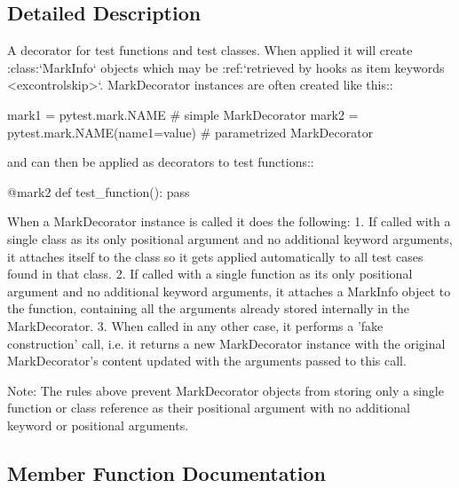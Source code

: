 \subsection{Detailed Description}
\begin{DoxyVerb}A decorator for test functions and test classes.  When applied
it will create :class:`MarkInfo` objects which may be
:ref:`retrieved by hooks as item keywords <excontrolskip>`.
MarkDecorator instances are often created like this::

    mark1 = pytest.mark.NAME              # simple MarkDecorator
    mark2 = pytest.mark.NAME(name1=value) # parametrized MarkDecorator

and can then be applied as decorators to test functions::

    @mark2
    def test_function():
        pass

When a MarkDecorator instance is called it does the following:
  1. If called with a single class as its only positional argument and no
     additional keyword arguments, it attaches itself to the class so it
     gets applied automatically to all test cases found in that class.
  2. If called with a single function as its only positional argument and
     no additional keyword arguments, it attaches a MarkInfo object to the
     function, containing all the arguments already stored internally in
     the MarkDecorator.
  3. When called in any other case, it performs a 'fake construction' call,
     i.e. it returns a new MarkDecorator instance with the original
     MarkDecorator's content updated with the arguments passed to this
     call.

Note: The rules above prevent MarkDecorator objects from storing only a
single function or class reference as their positional argument with no
additional keyword or positional arguments.\end{DoxyVerb}
 

\subsection{Member Function Documentation}
\mbox{\label{class__pytest_1_1mark_1_1structures_1_1_mark_decorator_a1213b316f242fe70d23d1ba830b62606}} 
